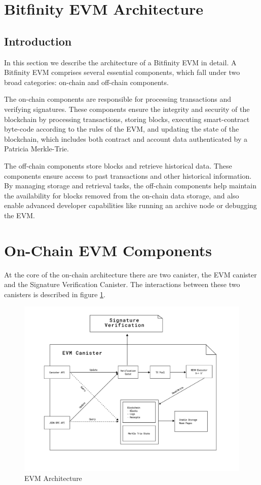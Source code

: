 \documentclass{article}
\begin{document}
\section {Bitfinity EVM Architecture}
\subsection{Introduction}
In this section we describe the architecture of a Bitfinity EVM in detail. A Bitfinity EVM comprises several essential components, which fall under two broad categories: on-chain and off-chain components.

The on-chain components are responsible for processing transactions and verifying signatures. These components ensure the integrity and security of the blockchain by processing transactions, storing blocks, executing smart-contract byte-code according to the rules of the EVM, and updating the state of the blockchain, which includes both contract and account data authenticated by a Patricia Merkle-Trie.

The off-chain components store blocks and retrieve historical data. These components ensure access to past transactions and other historical information. By managing storage and retrieval tasks, the off-chain components help maintain the availability for blocks removed from the on-chain data storage, and also enable  advanced developer capabilities like running an archive node or debugging the EVM.

\section{On-Chain EVM Components}

At the core of the on-chain architecture there are two canister, the EVM canister and the Signature Verification Canister.  The interactions between these two canisters is described in figure \ref{fig:evm-arch}.

 \begin{figure}[H]
    \centering
    \includegraphics[width=0.9\linewidth]{architecture.png}
    \caption{EVM Architecture}
    \label{fig:evm-arch}
\end{figure}
\end{document}

